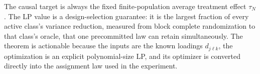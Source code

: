 The causal target is always the fixed finite-population average treatment effect \(\tau_N\). The LP value is a design-selection guarantee: it is the largest fraction of every active class's variance reduction, measured from block complete randomization to that class's oracle, that one precommitted law can retain simultaneously. The theorem is actionable because the inputs are the known loadings \(d_{j\ell k}\), the optimization is an explicit polynomial-size LP, and its optimizer is converted directly into the assignment law used in the experiment.